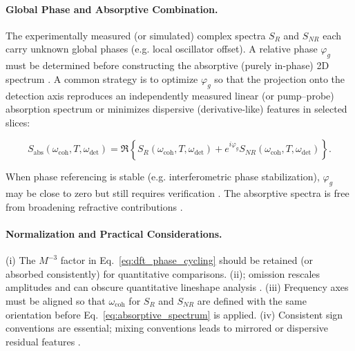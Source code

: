 \paragraph{Global Phase and Absorptive Combination.}

\noindent 
The experimentally measured (or simulated) complex spectra $S_{R}$ and $S_{NR}$ each carry unknown global phases (e.g. local oscillator offset). A relative phase $\varphi_g$ must be determined before constructing the absorptive (purely in-phase) 2D spectrum \cite{mukamel1995principlesnonlinearoptical, jonas2003twodimensionalfemtosecondspectroscopy, greenetal2024vibrationalcoherenceshalfbroadband}. A common strategy is to optimize $\varphi_g$ so that the projection onto the detection axis reproduces an independently measured linear (or pump--probe) absorption spectrum or minimizes dispersive (derivative-like) features in selected slices:

\begin{equation}
	S_{\text{abs}}(\omega_{\text{coh}}, T, \omega_{\text{det}})
	=
	\Re \left\{
	S_{R}(\omega_{\text{coh}}, T, \omega_{\text{det}}) + e^{i \varphi_g} S_{NR}(\omega_{\text{coh}}, T, \omega_{\text{det}})
	\right\}.
	\label{eq:absorptive_spectrum}
\end{equation}

\noindent 
When phase referencing is stable (e.g. interferometric phase stabilization), $\varphi_g$ may be close to zero but still requires verification \cite{brixneretal2004phasestabilizedtwodimensionalelectronic, greenetal2024vibrationalcoherenceshalfbroadband}.
The absorptive spectra is free from broadening refractive contributions \cite{fullerogilvie2015experimentalimplementationstwodimensional}.


\paragraph{Normalization and Practical Considerations.}
\noindent (i) The $M^{-3}$ factor in Eq.~\eqref{eq:dft_phase_cycling} should be retained (or absorbed consistently) for quantitative comparisons. (ii); omission rescales amplitudes and can obscure quantitative lineshape analysis \cite{cho2009twodimensionalopticalspectroscopy, greenetal2024vibrationalcoherenceshalfbroadband}. (iii) Frequency axes must be aligned so that $\omega_{\text{coh}}$ for $S_{R}$ and $S_{NR}$ are defined with the same orientation before Eq.~\eqref{eq:absorptive_spectrum} is applied. (iv) Consistent sign conventions are essential; mixing conventions leads to mirrored or dispersive residual features \cite{mukamel1995principlesnonlinearoptical, cho2009twodimensionalopticalspectroscopy, greenetal2024vibrationalcoherenceshalfbroadband}.


